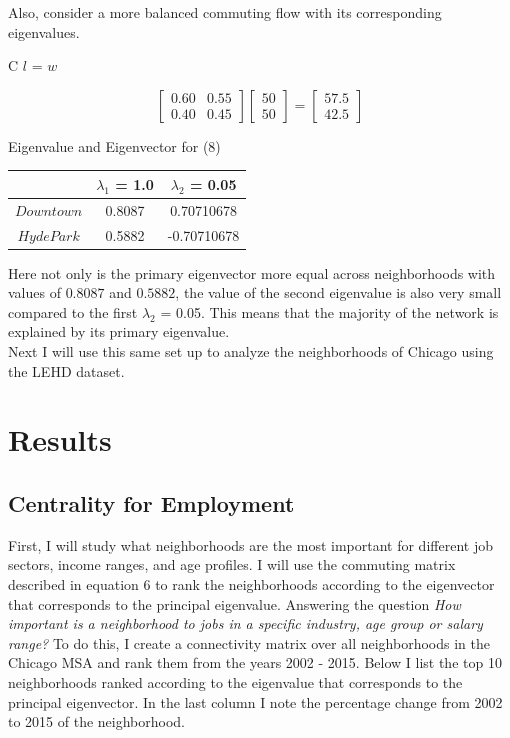 \documentclass{article}
\theoremstyle{definition}
\theoremstyle{remark}
\begin{document}
Also, consider a more balanced commuting flow with its corresponding eigenvalues.

\begin{center}C $l$ = $w$\end{center}
\begin{equation} 
  \begin{bmatrix}
    0.60 & 0.55\\
    0.40 & 0.45
  \end{bmatrix}
  \begin{bmatrix}
    50\\
    50
  \end{bmatrix}
  = 
  \begin{bmatrix}
    57.5\\
    42.5
  \end{bmatrix}
\end{equation}

\begin{center} 
Eigenvalue and Eigenvector for (8) \\
\begin{tabular}{||c | c c ||} 
 \hline
 & $\lambda_1$ = 1.0 & $\lambda_2$ = 0.05\\[0.5ex] 
 \hline\hline
 $Downtown$ & 0.8087 & 0.70710678 \\
 $Hyde Park$ & 0.5882 & -0.70710678  \\ 
 \hline
 \end{tabular}
 \end{center}

Here not only is the primary eigenvector more equal across neighborhoods with values of $0.8087$ and $0.5882$, the value of the second eigenvalue is also very small compared to the first $\lambda_2$ = 0.05.  This means that the majority of the network is explained by its primary eigenvalue. \\

Next I will use this same set up to analyze the neighborhoods of Chicago using the LEHD dataset.

\section{Results}
\subsection{Centrality for Employment}
First, I will study what neighborhoods are the most important for different job sectors, income ranges, and age profiles.  I will use the commuting matrix described in equation 6 to rank the neighborhoods according to the eigenvector that corresponds to the principal eigenvalue.  Answering the question \textit{How important is a neighborhood to jobs in a specific industry, age group or salary range?}  To do this, I create a connectivity matrix over all neighborhoods in the Chicago MSA and rank them from the years 2002 - 2015.  Below I list the top 10 neighborhoods ranked according to the eigenvalue that corresponds to the principal eigenvector.  In the last column I note the percentage change from 2002 to 2015 of the neighborhood. \\
\end{document}
